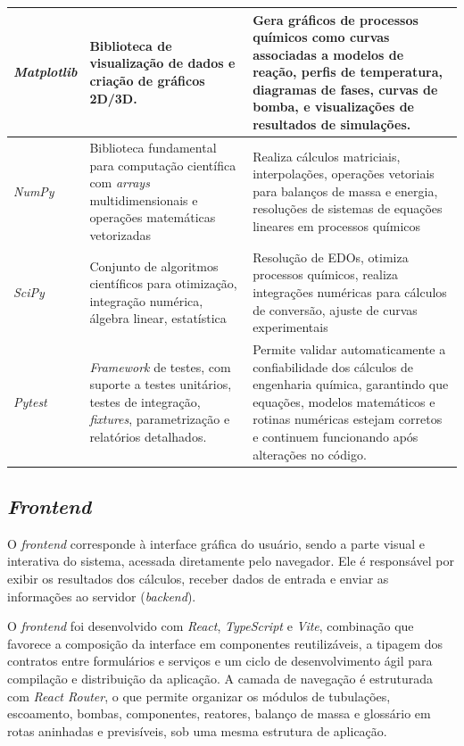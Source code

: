 \begin{longtable}{|>{\raggedright\arraybackslash}p{}|>{\raggedright\arraybackslash}p{}|>{\raggedright\arraybackslash}p{}|}
\textit{Matplotlib} & Biblioteca de visualização de dados e criação de gráficos 2D/3D. & Gera gráficos de processos químicos como curvas associadas a modelos de reação, perfis de temperatura, diagramas de fases, curvas de bomba, e visualizações de resultados de simulações. \\ \hline
\textit{NumPy} & Biblioteca fundamental para computação científica com \textit{arrays} multidimensionais e operações matemáticas vetorizadas & Realiza cálculos matriciais, interpolações, operações vetoriais para balanços de massa e energia, resoluções de sistemas de equações lineares em processos químicos \\ \hline
\textit{SciPy} & Conjunto de algoritmos científicos para otimização, integração numérica, álgebra linear, estatística & Resolução de EDOs, otimiza processos químicos, realiza integrações numéricas para cálculos de conversão, ajuste de curvas experimentais \\ \hline
\textit{Pytest} & \textit{Framework} de testes, com suporte a testes unitários, testes de integração, \textit{fixtures}, parametrização e relatórios detalhados. & Permite validar automaticamente a confiabilidade dos cálculos de engenharia química, garantindo que equações, modelos matemáticos e rotinas numéricas estejam corretos e continuem funcionando após alterações no código. \\ \hline
\end{longtable}

\subsection{\textit{Frontend}}

O \textit{frontend} corresponde à interface gráfica do usuário, sendo a parte visual e interativa do sistema, acessada diretamente pelo navegador. Ele é responsável por exibir os resultados dos cálculos, receber dados de entrada e enviar as informações ao servidor (\textit{backend}).

O \textit{frontend} foi desenvolvido com \textit{React}, \textit{TypeScript} e \textit{Vite}, combinação que favorece a composição da interface em componentes reutilizáveis, a tipagem dos contratos entre formulários e serviços e um ciclo de desenvolvimento ágil para compilação e distribuição da aplicação. A camada de navegação é estruturada com \textit{React Router}, o que permite organizar os módulos de tubulações, escoamento, bombas, componentes, reatores, balanço de massa e glossário em rotas aninhadas e previsíveis, sob uma mesma estrutura de aplicação.

